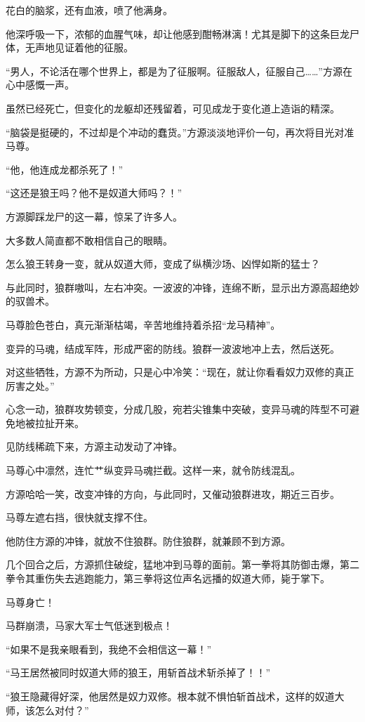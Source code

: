 \begin{this_body}
花白的脑浆，还有血液，喷了他满身。

他深呼吸一下，浓郁的血腥气味，却让他感到酣畅淋漓！尤其是脚下的这条巨龙尸体，无声地见证着他的征服。

“男人，不论活在哪个世界上，都是为了征服啊。征服敌人，征服自己……”方源在心中感慨一声。

虽然已经死亡，但变化的龙躯却还残留着，可见成龙于变化道上造诣的精深。

“脑袋是挺硬的，不过却是个冲动的蠢货。”方源淡淡地评价一句，再次将目光对准马尊。

“他，他连成龙都杀死了！”

“这还是狼王吗？他不是奴道大师吗？！”

方源脚踩龙尸的这一幕，惊呆了许多人。

大多数人简直都不敢相信自己的眼睛。

怎么狼王转身一变，就从奴道大师，变成了纵横沙场、凶悍如斯的猛士？

与此同时，狼群嗷叫，左右冲突。一波波的冲锋，连绵不断，显示出方源高超绝妙的驭兽术。

马尊脸色苍白，真元渐渐枯竭，辛苦地维持着杀招“龙马精神”。

变异的马魂，结成军阵，形成严密的防线。狼群一波波地冲上去，然后送死。

对这些牺牲，方源不为所动，只是心中冷笑：“现在，就让你看看奴力双修的真正厉害之处。”

心念一动，狼群攻势顿变，分成几股，宛若尖锥集中突破，变异马魂的阵型不可避免地被拉扯开来。

见防线稀疏下来，方源主动发动了冲锋。

马尊心中凛然，连忙艹纵变异马魂拦截。这样一来，就令防线混乱。

方源哈哈一笑，改变冲锋的方向，与此同时，又催动狼群进攻，期近三百步。

马尊左遮右挡，很快就支撑不住。

他防住方源的冲锋，就放不住狼群。防住狼群，就兼顾不到方源。

几个回合之后，方源抓住破绽，猛地冲到马尊的面前。第一拳将其防御击爆，第二拳令其重伤失去逃跑能力，第三拳将这位声名远播的奴道大师，毙于掌下。

马尊身亡！

马群崩溃，马家大军士气低迷到极点！

“如果不是我亲眼看到，我绝不会相信这一幕！”

“马王居然被同时奴道大师的狼王，用斩首战术斩杀掉了！！”

“狼王隐藏得好深，他居然是奴力双修。根本就不惧怕斩首战术，这样的奴道大师，该怎么对付？”

\end{this_body}

